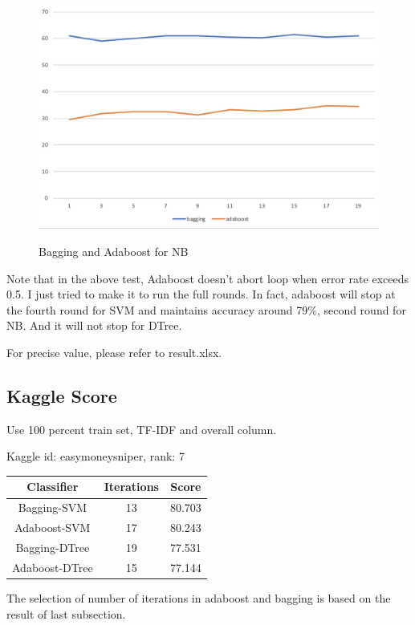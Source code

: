 \documentclass[paper=a4, fontsize=11pt, UTF8]{article} %
\begin{document}
\begin{figure}[H]
	\centering
	\includegraphics[scale=0.5]{./photos/nb.png}
    \label{nb}
    \caption{Bagging and Adaboost for NB}
\end{figure}
Note that in the above test, Adaboost doesn't abort loop when error rate exceeds 0.5. I just tried to make it to run the full rounds. In fact, adaboost will stop at the fourth round for SVM and maintains accuracy around 79\%, second round for NB. And it will not stop for DTree. 

For precise value, please refer to result.xlsx.

\subsection{Kaggle Score}
Use 100 percent train set, TF-IDF and overall column.

Kaggle id: easymoneysniper, rank: 7
\begin{center}
    \begin{tabular}{c|c|c}
        \hline
        Classifier & Iterations & Score\\
        \hline
        Bagging-SVM & 13 & 80.703\\
        \hline
        Adaboost-SVM & 17 & 80.243\\
        \hline
        Bagging-DTree & 19 & 77.531\\
        \hline
        Adaboost-DTree & 15 & 77.144\\
        \hline
    \end{tabular}
\end{center}
The selection of number of iterations in adaboost and bagging is based on the result of last subsection. 
\end{document}
